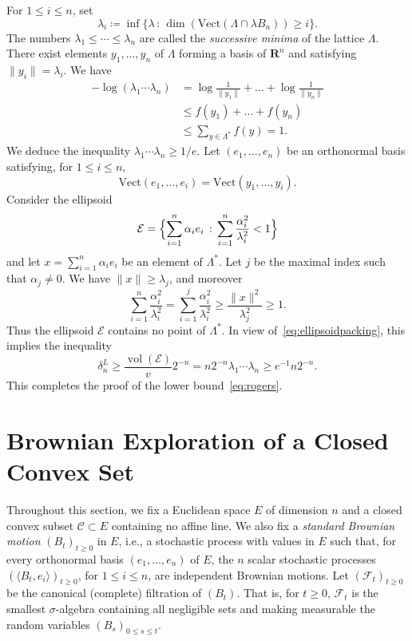 \documentclass[10pt,a4paper]{amsart}
\newcommand{\R}{\mathbf{R}}
\DeclareMathOperator{\vol}{vol}
\newcommand{\scalar}[2]{\langle #1 , #2\rangle}
\renewcommand{\leq}{\leqslant}
\renewcommand{\geq}{\geqslant}
\begin{document}
For $1 \leq i \leq n$, set
\[ \lambda_i \coloneqq  \inf \{ \lambda \, : \, \dim \left( \mathrm{Vect} ( \Lambda \cap \lambda B_n ) \right) \geq i \}. \]
The numbers $\lambda_1 \leq \cdots \leq \lambda_n$ are called the \emph{successive minima} of the lattice $\Lambda$. There exist elements $y_1,\dots,y_n$ of $\Lambda$ forming a basis of $\R^n$ and satisfying $\|y_i\|=\lambda_i$. We have
\begin{align*}
-\log (\lambda_1\cdots \lambda_n) & =  \log \frac{1}{\|y_1\|} + \dots + \log \frac{1}{\|y_n\|} \\
& \leq  f(y_1) + \dots + f(y_n) \\
& \leq  \sum_{y \in \Lambda^*} f(y) =  1.
\end{align*}
We deduce the inequality $\lambda_1 \cdots \lambda_n \geq 1/e$. Let $(e_1,\dots,e_n)$ be an orthonormal basis satisfying, for $1 \leq i \leq n$,
\[ \mathrm{Vect} (e_1,\dots,e_i) = \mathrm{Vect} (y_1,\dots,y_i) .\]
Consider the ellipsoid
\[ \mathcal{E} = \Bigl\{ \sum_{i=1}^n \alpha_i e_i \, : \, \sum_{i=1}^n \frac{\alpha_i^2}{\lambda_i^2} < 1 \Bigr\} \]
and let $x= \sum_{i=1}^n \alpha_i e_i$ be an element of $\Lambda^*$. Let $j$ be the maximal index such that $\alpha_j \neq 0$. We have $\|x\| \geq \lambda_j$, and moreover
\[ \sum_{i=1}^n \frac{\alpha_i^2}{\lambda_i^2} = \sum_{i=1}^j \frac{\alpha_i^2}{\lambda_i^2}
\geq \frac{\|x\|^2}{\lambda_j^2} \geq 1.
\]
Thus the ellipsoid $\mathcal{E}$ contains no point of $\Lambda^*$. In view of~\eqref{eq:ellipsoidpacking}, this implies the inequality
\[ \delta_n^L \geq \frac{\vol (\mathcal{E})}{v} 2^{-n}= n 2^{-n} \lambda_1 \cdots \lambda_n \geq e^{-1}n2^{-n} .\]
This completes the proof of the lower bound~\eqref{eq:rogers}.
 
 
\section{Brownian Exploration of a Closed Convex Set} \label{sec:exploration}
 
Throughout this section, we fix a Euclidean space $E$ of dimension $n$ and a closed convex subset $\mathscr{C} \subset E$ containing no affine line. We also fix a \emph{standard Brownian motion} $(B_t)_{t \geq 0}$ in $E$, i.e., a stochastic process with values in $E$ such that, for every orthonormal basis $(e_1,\dots,e_n)$ of $E$, the $n$ scalar stochastic processes $(\scalar{B_t}{e_i})_{t \geq 0}$, for $1 \leq i \leq n$, are independent Brownian motions. Let $(\mathcal{F}_t)_{t \geq 0}$ be the canonical (complete) filtration of $(B_t)$. That is, for $t \geq 0$, $\mathcal{F}_t$ is the smallest $\sigma$-algebra containing all negligible sets and making measurable the random variables $(B_s)_{0 \leq s \leq t}$.
 
\end{document}
